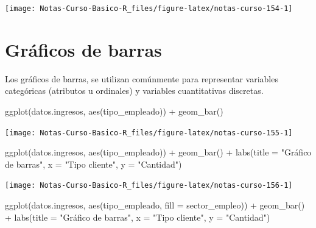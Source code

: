 \documentclass[
  12pt,
]{book}
\newenvironment{Shaded}{\begin{snugshade}}{\end{snugshade}}
\newcommand{\AttributeTok}[1]{\textcolor[rgb]{0.77,0.63,0.00}{#1}}
\newcommand{\FunctionTok}[1]{\textcolor[rgb]{0.00,0.00,0.00}{#1}}
\newcommand{\NormalTok}[1]{#1}
\newcommand{\SpecialCharTok}[1]{\textcolor[rgb]{0.00,0.00,0.00}{#1}}
\newcommand{\StringTok}[1]{\textcolor[rgb]{0.31,0.60,0.02}{#1}}
\begin{document}
\begin{center}\texttt{[image: Notas-Curso-Basico-R\_files/figure-latex/notas-curso-154-1]} \end{center}

\hypertarget{gruxe1ficos-de-barras}{%
\section{\texorpdfstring{\textbf{Gráficos de barras}}{Gráficos de barras}}\label{gruxe1ficos-de-barras}}

Los gráficos de barras, se utilizan comúnmente para representar variables categóricas (atributos u ordinales) y variables cuantitativas discretas.

\begin{Shaded}
\begin{Highlighting}[]
\FunctionTok{ggplot}\NormalTok{(datos.ingresos, }\FunctionTok{aes}\NormalTok{(tipo\_empleado)) }\SpecialCharTok{+}
  \FunctionTok{geom\_bar}\NormalTok{()}
\end{Highlighting}
\end{Shaded}

\begin{center}\texttt{[image: Notas-Curso-Basico-R\_files/figure-latex/notas-curso-155-1]} \end{center}

\begin{Shaded}
\begin{Highlighting}[]
\FunctionTok{ggplot}\NormalTok{(datos.ingresos, }\FunctionTok{aes}\NormalTok{(tipo\_empleado)) }\SpecialCharTok{+}
  \FunctionTok{geom\_bar}\NormalTok{() }\SpecialCharTok{+}
  \FunctionTok{labs}\NormalTok{(}\AttributeTok{title =} \StringTok{"Gráfico de barras"}\NormalTok{,}
    \AttributeTok{x =} \StringTok{"Tipo cliente"}\NormalTok{,}
    \AttributeTok{y =} \StringTok{"Cantidad"}\NormalTok{)}
\end{Highlighting}
\end{Shaded}

\begin{center}\texttt{[image: Notas-Curso-Basico-R\_files/figure-latex/notas-curso-156-1]} \end{center}

\begin{Shaded}
\begin{Highlighting}[]
\FunctionTok{ggplot}\NormalTok{(datos.ingresos, }\FunctionTok{aes}\NormalTok{(tipo\_empleado, }\AttributeTok{fill =}\NormalTok{ sector\_empleo)) }\SpecialCharTok{+}
  \FunctionTok{geom\_bar}\NormalTok{() }\SpecialCharTok{+}
  \FunctionTok{labs}\NormalTok{(}\AttributeTok{title =} \StringTok{"Gráfico de barras"}\NormalTok{,}
    \AttributeTok{x =} \StringTok{"Tipo cliente"}\NormalTok{,}
    \AttributeTok{y =} \StringTok{"Cantidad"}\NormalTok{)}
\end{Highlighting}
\end{Shaded}
\end{document}
